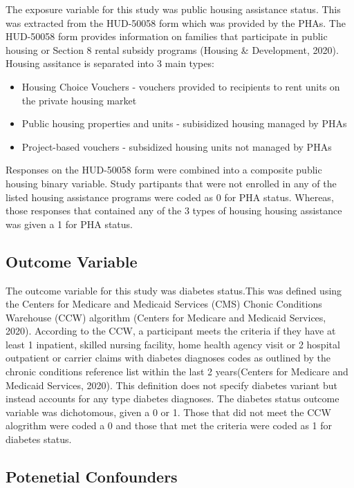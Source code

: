 \documentclass [11pt, proquest] {uwthesis}[2015/03/03]
\providecommand{\tightlist}{%
  \setlength{\itemsep}{0pt}\setlength{\parskip}{0pt}}
\begin{document}
The exposure variable for this study was public housing assistance
status. This was extracted from the HUD-50058 form which was provided by
the PHAs. The HUD-50058 form provides information on families that
participate in public housing or Section 8 rental subsidy programs
(Housing \& Development, 2020). Housing assitance is separated into 3
main types:
\begin{itemize}
\tightlist
\item
  Housing Choice Vouchers - vouchers provided to recipients to rent
  units on the private housing market
\item
  Public housing properties and units - subisidized housing managed by
  PHAs
\item
  Project-based vouchers - subsidized housing units not managed by PHAs
\end{itemize}
Responses on the HUD-50058 form were combined into a composite public
housing binary variable. Study partipants that were not enrolled in any
of the listed housing assistance programs were coded as 0 for PHA
status. Whereas, those responses that contained any of the 3 types of
housing housing assistance was given a 1 for PHA status.

\subsection{Outcome Variable}\label{outcome-variable}

The outcome variable for this study was diabetes status.This was defined
using the Centers for Medicare and Medicaid Services (CMS) Chonic
Conditions Warehouse (CCW) algorithm (Centers for Medicare and Medicaid
Services, 2020). According to the CCW, a participant meets the criteria
if they have at least 1 inpatient, skilled nursing facility, home health
agency visit or 2 hospital outpatient or carrier claims with diabetes
diagnoses codes as outlined by the chronic conditions reference list
within the last 2 years(Centers for Medicare and Medicaid Services,
2020). This definition does not specify diabetes variant but instead
accounts for any type diabetes diagnoses. The diabetes status outcome
variable was dichotomous, given a 0 or 1. Those that did not meet the
CCW alogrithm were coded a 0 and those that met the criteria were coded
as 1 for diabetes status.

\subsection{Potenetial Confounders}\label{potenetial-confounders}
\end{document}
